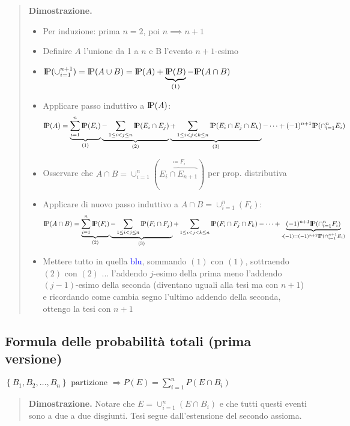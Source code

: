 \documentclass[a4paper,10pt]{article}
\newcommand{\pr}{\text{I\kern-0.15em P}} %
\theoremstyle{remark}
\theoremstyle{definition}
\newenvironment{dimo}{\begin{quote}\textbf{Dimostrazione.}}{\end{quote}} %
\begin{document}
  \begin{dimo}
         \begin{itemize}
        \item Per induzione: prima $n=2$, poi $n \implies n+1$
        \item Definire $A$ l'unione da 1 a $n$ e B l'evento $n+1$-esimo
        \item \textcolor{blue}{$\pr(\cup_{i=1}^{n+1})=\pr(A\cup B) = \pr (A)+\underbrace{\pr(B)}_{(1)} -\pr(A\cap B)$} 
        \item Applicare passo induttivo a $\pr(A)$:
          \[\pr (A) = \underbrace{\sum_{i=1}^n \pr(E_i)}_{(1)}\underbrace{-\sum_{1\le i<j\le n}\pr(E_i\cap E_j)}_{(2)}\underbrace{+\sum_{1\le i<j<k\le n}\pr(E_i\cap E_j \cap E_k)}_{(3)}-\dotsm+(-1)^{n+1}\pr (\cap_{i=1}^n E_i)\]

        \item Osservare che $A\cap B =\cup_{i=1}^{n}(\overbrace{E_i\cap E_{n+1}}^{\coloneqq F_i})$ per prop. distributiva
        \item Applicare di nuovo passo induttivo a $A\cap B =\cup_{i=1}^{n}(F_i)$:
         \[\pr (A\cap B) = \underbrace{\sum_{i=1}^n \pr(F_i)}_{(2)}\underbrace{-\sum_{1\le i<j\le n}\pr(F_i\cap F_j)}_{(3)}+\sum_{1\le i<j<k\le n}\pr(F_i\cap F_j \cap F_k)-\dotsm+\underbrace{(-1)^{n+1}\pr (\cap_{i=1}^n F_i)}_{\cdot (-1) = (-1)^{n+2}\pr(\cap_{i=1}^{n+1}E_i)}\]
         \item Mettere tutto in quella \textcolor{blue}{blu}, sommando $(1)$ con  $(1)$, sottraendo  $(2)$ con  $(2)$ ... l'addendo $j$-esimo della prima meno l'addendo $(j-1)$-esimo della seconda (diventano uguali alla tesi ma con $n+1$) e ricordando come cambia segno l'ultimo addendo della seconda, ottengo la tesi con $n+1$
    \end{itemize}
  \end{dimo}

  
\subsection*{Formula delle probabilità totali (prima versione)}

$\left\{ B_{1},B_{2},\ldots,B_{n}\right\} \text{ partizione }\Longrightarrow P\left(E\right)=\sum_{i=1}^{n}P\left(E\cap B_{i}\right)$

\begin{dimo}
    Notare che $E=\cup_{i=1}^n(E\cap B_i)$ e che tutti questi eventi sono a due a due disgiunti. Tesi segue dall'estensione del secondo assioma.
\end{dimo}
\end{document}
